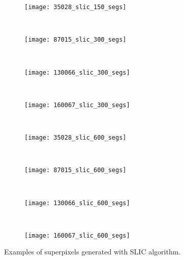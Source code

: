 \begin{figure}[!ht]
    \begin{subfigure}[t]{\textwidth+20pt\relax}
    	\texttt{[image: 35028\_slic\_150\_segs]} 
    \end{subfigure}      
    ~ %
    \begin{subfigure}[b]{0.2\textwidth}
        \texttt{[image: 87015\_slic\_300\_segs]}
    \end{subfigure}
    ~ %
    \begin{subfigure}[b]{0.2\textwidth}
        \texttt{[image: 130066\_slic\_300\_segs]}
    \end{subfigure}
    ~ %
    \begin{subfigure}[b]{0.2\textwidth}
        \texttt{[image: 160067\_slic\_300\_segs]}
    \end{subfigure} \\ [2ex]       
    
    \begin{subfigure}[t]{\textwidth+20pt\relax}
    	\texttt{[image: 35028\_slic\_600\_segs]} 
    \end{subfigure}      
    ~ %
    \begin{subfigure}[b]{0.2\textwidth}
        \texttt{[image: 87015\_slic\_600\_segs]}
    \end{subfigure}
    ~ %
    \begin{subfigure}[b]{0.2\textwidth}
        \texttt{[image: 130066\_slic\_600\_segs]}
    \end{subfigure}
    ~ %
    \begin{subfigure}[b]{0.2\textwidth}
        \texttt{[image: 160067\_slic\_600\_segs]}
    \end{subfigure}     
    
	\caption{Examples of superpixels generated with SLIC algorithm.}\label{fig:slic_suprepixels}    
\end{figure}

